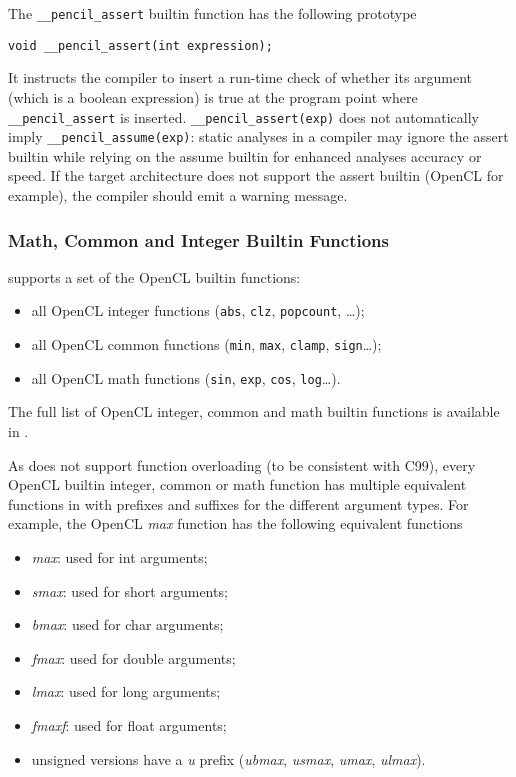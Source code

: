 The \lstinline!__pencil_assert! builtin function has the following prototype

\lstinline!void __pencil_assert(int expression);!

  It instructs the compiler to insert a run-time check of whether its argument
  (which is a boolean expression) is true at the program point where
  \lstinline!__pencil_assert! is inserted.
  \lstinline!__pencil_assert(exp)! does not automatically imply
  \lstinline!__pencil_assume(exp)!: static analyses in a \pencil compiler may
  ignore the assert builtin while relying on
  the assume builtin for enhanced analyses accuracy or speed.  If the
  target architecture does not support the assert builtin (OpenCL for
  example), the \pencil compiler should emit a warning message.

\subsubsection{\pencil Math, Common and Integer Builtin Functions}

\pencil supports a set of the OpenCL builtin functions:
\begin{itemize}
  \item all OpenCL integer functions (\lstinline!abs!, \lstinline!clz!,
        \lstinline!popcount!,  \dots);
  \item all OpenCL common functions (\lstinline!min!, \lstinline!max!,
        \lstinline!clamp!, \lstinline!sign!\dots);
  \item all OpenCL math functions (\lstinline!sin!, \lstinline!exp!,
        \lstinline!cos!, \lstinline!log!\dots).
\end{itemize}

The full list of OpenCL integer, common and math builtin functions is
available in \cite{opencl-1.2}.

As \pencil does not support function overloading (to be consistent
with C99), every OpenCL builtin integer, common or math function
has multiple equivalent functions in \pencil with prefixes and
suffixes for the different argument types.
For example, the OpenCL \emph{max} function has the
following equivalent \pencil functions
\begin{itemize}
 \item \emph{max}: used for int arguments;
 \item \emph{smax}: used for short arguments;
 \item \emph{bmax}: used for char arguments;
 \item \emph{fmax}: used for double arguments;
 \item \emph{lmax}: used for long arguments;
 \item \emph{fmaxf}: used for float arguments;
 \item unsigned versions have a \emph{u} prefix
 (\emph{ubmax}, \emph{usmax}, \emph{umax}, \emph{ulmax}).
\end{itemize}

